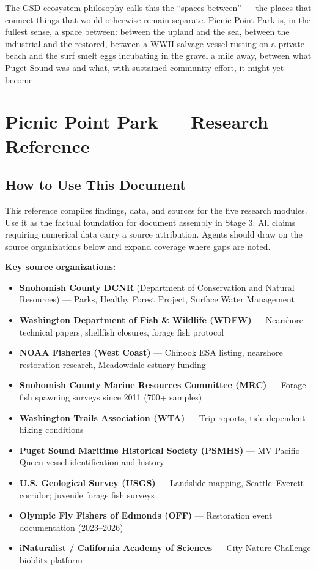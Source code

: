\documentclass[11pt,letterpaper]{article}
\newcommand{\stageheader}[2]{%
  \noindent\colorbox{#2}{\makebox[\textwidth][l]{%
    \textcolor{white}{\bfseries\sffamily\hspace{6pt}#1\hspace{6pt}}}}%
  \vspace{0.5em}\par%
}
\begin{document}
The GSD ecosystem philosophy calls this the ``spaces between'' --- the places that connect things that would otherwise remain separate. Picnic Point Park is, in the fullest sense, a space between: between the upland and the sea, between the industrial and the restored, between a WWII salvage vessel rusting on a private beach and the surf smelt eggs incubating in the gravel a mile away, between what Puget Sound was and what, with sustained community effort, it might yet become.

\newpage
\stageheader{STAGE 2 --- RESEARCH REFERENCE}{secondary}

\section{Picnic Point Park --- Research Reference}

\subsection{How to Use This Document}

This reference compiles findings, data, and sources for the five research modules. Use it as the factual foundation for document assembly in Stage 3. All claims requiring numerical data carry a source attribution. Agents should draw on the source organizations below and expand coverage where gaps are noted.

\textbf{Key source organizations:}
\begin{itemize}
  \item \textbf{Snohomish County DCNR} (Department of Conservation and Natural Resources) --- Parks, Healthy Forest Project, Surface Water Management
  \item \textbf{Washington Department of Fish \& Wildlife (WDFW)} --- Nearshore technical papers, shellfish closures, forage fish protocol
  \item \textbf{NOAA Fisheries (West Coast)} --- Chinook ESA listing, nearshore restoration research, Meadowdale estuary funding
  \item \textbf{Snohomish County Marine Resources Committee (MRC)} --- Forage fish spawning surveys since 2011 (700+ samples)
  \item \textbf{Washington Trails Association (WTA)} --- Trip reports, tide-dependent hiking conditions
  \item \textbf{Puget Sound Maritime Historical Society (PSMHS)} --- MV Pacific Queen vessel identification and history
  \item \textbf{U.S. Geological Survey (USGS)} --- Landslide mapping, Seattle--Everett corridor; juvenile forage fish surveys
  \item \textbf{Olympic Fly Fishers of Edmonds (OFF)} --- Restoration event documentation (2023--2026)
  \item \textbf{iNaturalist / California Academy of Sciences} --- City Nature Challenge bioblitz platform
\end{itemize}
\end{document}

